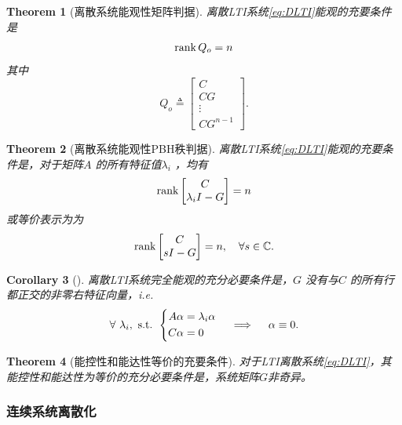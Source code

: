 \documentclass[14pt,a4paper]{article}
\theoremstyle{plain}
\newtheorem{thm}{Theorem}[section]
\theoremstyle{definition}
\theoremstyle{remark}
\theoremstyle{plain}
\theoremstyle{plain}
\newtheorem{cor}[thm]{Corollary}
\theoremstyle{plain}
\theoremstyle{definition}
\theoremstyle{remark}
\numberwithin{equation}{section}
\begin{document}
			\begin{thm}[离散系统能观性矩阵判据]  
			\label{the:离散系统能观性矩阵判据}
				离散LTI系统\eqref{eq:DLTI}能观的充要条件是
				\[
				\mathop{\textnormal{rank}} Q_o = n
				\] 
				其中
				\[
				Q_o \triangleq \begin{bmatrix}
					C \\ CG \\ \vdots \\ CG^{n-1} 
				\end{bmatrix} 
				.\] 
			\end{thm} 

			\begin{thm}[离散系统能观性PBH秩判据]  
			\label{the:离散系统能观性PBH秩判据}
				离散LTI系统\eqref{eq:DLTI}能观的充要条件是，对于矩阵$A$ 的所有特征值$\lambda_{i}$ ，均有
				\[
				\mathop{\textnormal{rank}} \begin{bmatrix}
					C\\ \lambda_{i} I - G 
				\end{bmatrix}  = n
				\] 
				或等价表示为为	
				\[
				\mathop{\textnormal{rank}} \begin{bmatrix}
					C\\  sI - G 
				\end{bmatrix}  = n, \quad \forall s\in \mathbb{C}
				.\] 
			\end{thm}

			\begin{cor}[]  
			\label{cor:834}
				离散LTI系统完全能观的充分必要条件是，$G$ 没有与$C$ 的所有行都正交的非零右特征向量，i.e. 
				\[
				\forall \ \lambda_{i},\ \textnormal{s.t. } 
				\begin{cases}
					\begin{aligned}
						A \alpha &= \lambda_{i}\alpha \\ 
						C \alpha &= 0
					\end{aligned} 
				\end{cases} 
					\implies \quad 
					\alpha \equiv 0.
				\] 
			\end{cor} 

			\begin{thm}[能控性和能达性等价的充要条件]  
			\label{the:能控性和能达性等价的充要条件}
				对于LTI离散系统\eqref{eq:DLTI}，其能控性和能达性为等价的充分必要条件是，系统矩阵$G$非奇异。
			\end{thm} 


			\subsubsection{连续系统离散化}%
			\label{ssub:连续系统离散化}
\end{document}
